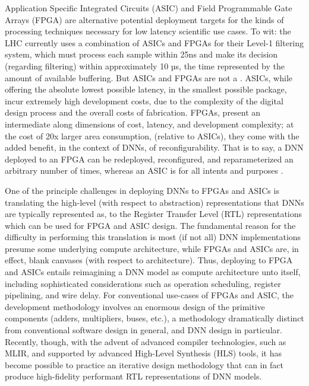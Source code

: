 Application Specific Integrated Circuits (ASIC) and Field Programmable Gate Arrays (FPGA) are alternative potential deployment targets for the kinds of processing techniques necessary for low latency scientific use cases.
To wit: the LHC currently uses a combination of ASICs and FPGAs for their Level-1 filtering system, which must process each sample within 25ns and make its decision (regarding filtering) within approximately 10 µs, the time represented by the amount of available buffering.
But ASICs and FPGAs are not a .
ASICs, while offering the absolute lowest possible latency, in the smallest possible package, incur extremely high development costs, due to the complexity of the digital design process and the overall costs of fabrication.
FPGAs, present an intermediate along dimensions of cost, latency, and development complexity; at the cost of 20x larger area consumption,  (relative to ASICs), they come with the added benefit, in the context of DNNs, of reconfigurability.
That is to say, a DNN deployed to an FPGA can be redeployed, reconfigured, and reparameterized an arbitrary number of times, whereas an ASIC is for all intents and purposes .

One of the principle challenges in deploying DNNs to FPGAs and ASICs is translating the high-level (with respect to abstraction) representations that DNNs are typically represented as, to the Register Transfer Level (RTL) representations which can be used for FPGA and ASIC design.
The fundamental reason for the difficulty in performing this translation is most (if not all) DNN implementations presume some underlying compute architecture, while FPGAs and ASICs are, in effect, blank canvases (with respect to architecture).
Thus, deploying to FPGA and ASICs entails reimagining a DNN model as compute architecture unto itself, including sophisticated considerations such as operation scheduling, register pipelining, and wire delay.
For conventional use-cases of FPGAs and ASIC, the development methodology involves an enormous  design of the primitive components (adders, multipliers, buses, etc.), a methodology dramatically distinct from conventional software design in general, and DNN design in particular.
Recently, though, with the advent of advanced compiler technologies, such as MLIR, and supported by advanced High-Level Synthesis (HLS) tools, it has become possible to practice an iterative design methodology that can in fact produce high-fidelity performant RTL representations of DNN models.

